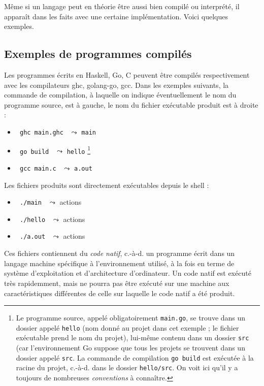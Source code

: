 \documentclass[a4paper,francais]{insalyon}
\newcommand{\cad}{c.-à-d.}
\begin{document}
Même si un langage peut en théorie être aussi bien compilé ou interprété, il apparaît dans les faits avec une certaine implémentation. Voici quelques exemples.

\subsection{Exemples de programmes compilés}

Les programmes écrits en Haskell, Go, C peuvent être compilés respectivement avec les compilateurs ghc, golang-go, gcc.
Dans les exemples suivants, la commande de compilation, à laquelle on indique éventuellement le nom du programme source, est à gauche,
le nom du fichier exécutable produit est à droite :
\begin{itemize}
  \item \verb! ghc main.ghc ! $\leadsto$ \texttt{main}
  \item \verb! go build ! $\leadsto$ \texttt{hello}
    \footnote{ Le programme source, appelé obligatoirement \texttt{main.go}, se trouve dans un dossier appelé \texttt{hello} (nom donné au projet dans cet exemple ; le fichier exécutable prend le nom du projet), lui-même contenu dans un dossier \texttt{src} (car l'environnement Go suppose que tous les projets se trouvent dans un dossier appelé \texttt{src}. La commande de compilation \texttt{go build} est exécutée à la racine du projet, {\cad} dans le dossier \texttt{hello/src}. On voit ici qu'il y a toujours de nombreuses \emph{conventions} à connaître. }
  \item \verb! gcc main.c ! $\leadsto$ \texttt{a.out}
\end{itemize}

Les fichiers produits sont directement exécutables depuis le shell : 
\begin{itemize}
\item \verb! ./main ! $\leadsto$ actions
\item \verb! ./hello ! $\leadsto$ actions
\item \verb! ./a.out ! $\leadsto$ actions
\end{itemize}

Ces fichiers contiennent du \emph{code natif}, {\cad} un programme écrit dans un langage machine spécifique à l'environnement utilisé, à la fois en terme de système d'exploitation et d'architecture d'ordinateur. Un code natif est exécuté très rapidemment, mais ne pourra pas être exécuté sur une machine aux caractéristiques différentes de celle sur laquelle le code natif a été produit. 
\end{document}
